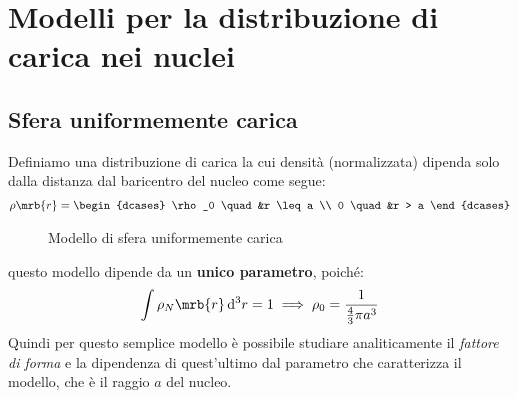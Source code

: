 \section{Modelli per la distribuzione di carica nei nuclei}
\subsection{Sfera uniformemente carica}
Definiamo una distribuzione di carica la cui densità (normalizzata) dipenda
solo dalla distanza dal baricentro del nucleo come segue:
\begin{align}
	\rho \mrb{r} =
	\begin{dcases}
		\rho_0 \quad &r \leq a \\
		0 \quad &r > a
	\end{dcases}
	\label{eq:densita_carica_sfera_uniforme}
\end{align}

\begin{figure}[ht]
  \centering
  \caption{Modello di sfera uniformemente carica}
	\label{fig:modello_sfera_uniformemente_carica}
\end{figure}

questo modello dipende da un \textbf{unico parametro}, poiché:
\begin{equation}
  \int \rho_N\mrb{r} \, \mathrm{d}^3r = 1 \implies \rho_0 =
  \frac{1}{\frac{4}{3}\pi a^3}
	\label{eq:rho_0}
\end{equation}
Quindi per questo semplice modello è possibile studiare analiticamente il
\textit{fattore di forma} e la dipendenza di quest'ultimo dal parametro che
caratterizza il modello, che è il raggio $a$ del nucleo.

